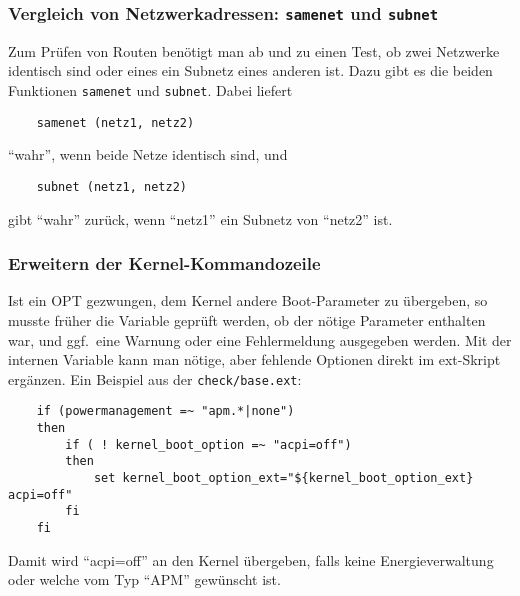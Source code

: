 \subsubsection{Vergleich von Netzwerkadressen: \texttt{samenet} und \texttt{subnet}}

Zum Prüfen von Routen benötigt man ab und zu einen Test, ob zwei
Netzwerke identisch sind oder eines ein Subnetz eines anderen
ist. Dazu gibt es die beiden Funktionen \texttt{samenet} und
\texttt{subnet}. Dabei liefert

\begin{example}
\begin{verbatim}
    samenet (netz1, netz2)
\end{verbatim}
\end{example}

"`wahr"', wenn beide Netze identisch sind, und

\begin{example}
\begin{verbatim}
    subnet (netz1, netz2)
\end{verbatim}
\end{example}

gibt "`wahr"' zurück, wenn "`netz1"' ein Subnetz von "`netz2"' ist.

\subsubsection{Erweitern der Kernel-Kommandozeile}

Ist ein OPT gezwungen, dem Kernel andere Boot-Parameter zu übergeben, so musste
früher die Variable  geprüft werden, ob der nötige
Parameter enthalten war, und ggf.\ eine Warnung oder eine Fehlermeldung
ausgegeben werden. Mit der internen Variable 
kann man nötige, aber fehlende Optionen direkt im ext-Skript ergänzen. Ein
Beispiel aus der \texttt{check/base.ext}:

\begin{example}
\begin{verbatim}
    if (powermanagement =~ "apm.*|none")
    then
        if ( ! kernel_boot_option =~ "acpi=off")
        then
            set kernel_boot_option_ext="${kernel_boot_option_ext} acpi=off"
        fi
    fi
\end{verbatim}
\end{example}

Damit wird "`acpi=off"' an den Kernel übergeben, falls keine Energieverwaltung
oder welche vom Typ "`APM"' gewünscht ist.

